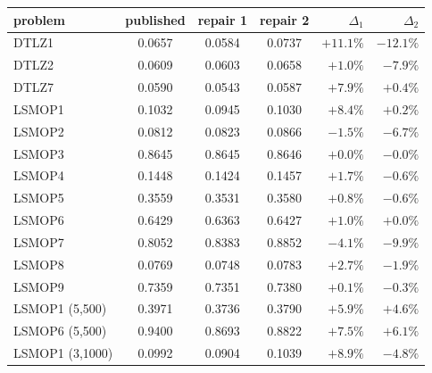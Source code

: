 \footnotesize
\setlength{\tabcolsep}{5pt}
\begin{tabular}{lccc rr}
\toprule
problem & published & repair 1 & repair 2 & $\Delta_1$ & $\Delta_2$ \\
\midrule
DTLZ1 & 0.0657 & 0.0584 & 0.0737 & $+11.1\%$ & $-12.1\%$ \\
DTLZ2 & 0.0609 & 0.0603 & 0.0658 & $+1.0\%$ & $-7.9\%$ \\
DTLZ7 & 0.0590 & 0.0543 & 0.0587 & $+7.9\%$ & $+0.4\%$ \\
LSMOP1 & 0.1032 & 0.0945 & 0.1030 & $+8.4\%$ & $+0.2\%$ \\
LSMOP2 & 0.0812 & 0.0823 & 0.0866 & $-1.5\%$ & $-6.7\%$ \\
LSMOP3 & 0.8645 & 0.8645 & 0.8646 & $+0.0\%$ & $-0.0\%$ \\
LSMOP4 & 0.1448 & 0.1424 & 0.1457 & $+1.7\%$ & $-0.6\%$ \\
LSMOP5 & 0.3559 & 0.3531 & 0.3580 & $+0.8\%$ & $-0.6\%$ \\
LSMOP6 & 0.6429 & 0.6363 & 0.6427 & $+1.0\%$ & $+0.0\%$ \\
LSMOP7 & 0.8052 & 0.8383 & 0.8852 & $-4.1\%$ & $-9.9\%$ \\
LSMOP8 & 0.0769 & 0.0748 & 0.0783 & $+2.7\%$ & $-1.9\%$ \\
LSMOP9 & 0.7359 & 0.7351 & 0.7380 & $+0.1\%$ & $-0.3\%$ \\
LSMOP1 (5,500) & 0.3971 & 0.3736 & 0.3790 & $+5.9\%$ & $+4.6\%$ \\
LSMOP6 (5,500) & 0.9400 & 0.8693 & 0.8822 & $+7.5\%$ & $+6.1\%$ \\
LSMOP1 (3,1000) & 0.0992 & 0.0904 & 0.1039 & $+8.9\%$ & $-4.8\%$ \\
\bottomrule
\end{tabular}
